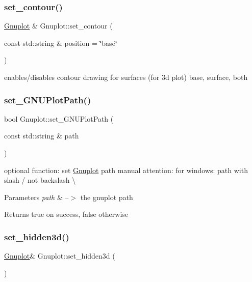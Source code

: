 \subsubsection{\texorpdfstring{set\+\_\+contour()}{set\_contour()}}
{\footnotesize\ttfamily \hyperlink{classGnuplot}{Gnuplot} \& Gnuplot\+::set\+\_\+contour (\begin{DoxyParamCaption}\item[{const std\+::string \&}]{position = {\ttfamily \char`\"{}base\char`\"{}} }\end{DoxyParamCaption})}

enables/disables contour drawing for surfaces (for 3d plot) base, surface, both \mbox{\label{classGnuplot_a67cae885c26ced821e335d98986f1967}} 
\subsubsection{\texorpdfstring{set\+\_\+\+G\+N\+U\+Plot\+Path()}{set\_GNUPlotPath()}}
{\footnotesize\ttfamily bool Gnuplot\+::set\+\_\+\+G\+N\+U\+Plot\+Path (\begin{DoxyParamCaption}\item[{const std\+::string \&}]{path }\end{DoxyParamCaption})\hspace{0.3cm}{\ttfamily [static]}}



optional function\+: set \hyperlink{classGnuplot}{Gnuplot} path manual attention\+: for windows\+: path with slash \textquotesingle{}/\textquotesingle{} not backslash \textquotesingle{}\textbackslash{}\textquotesingle{} 


\begin{DoxyParams}{Parameters}
{\em path} & --$>$ the gnuplot path\\
\hline
\end{DoxyParams}
\begin{DoxyReturn}{Returns}
true on success, false otherwise 
\end{DoxyReturn}
\mbox{\label{classGnuplot_a891f9800705eddc3f73886f265c009b8}} 
\subsubsection{\texorpdfstring{set\+\_\+hidden3d()}{set\_hidden3d()}}
{\footnotesize\ttfamily \hyperlink{classGnuplot}{Gnuplot}\& Gnuplot\+::set\+\_\+hidden3d (\begin{DoxyParamCaption}{ }\end{DoxyParamCaption})\hspace{0.3cm}{\ttfamily [inline]}}

